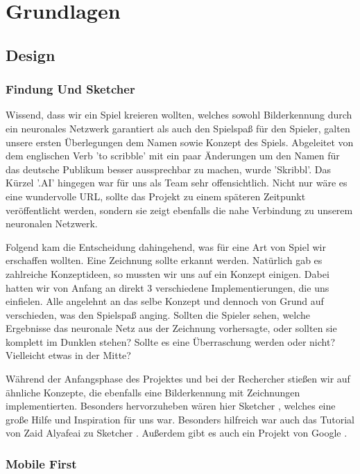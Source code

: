 \documentclass[11pt]{article}
\begin{document}
\section{Grundlagen}
\label{chap: Grundlagen}
\subsection{Design}
\subsubsection{Findung Und Sketcher}

Wissend, dass wir ein Spiel kreieren wollten, welches sowohl Bilderkennung durch ein neuronales Netzwerk garantiert als auch den Spielspaß für den Spieler, galten unsere ersten Überlegungen dem Namen sowie Konzept des Spiels.
Abgeleitet von dem englischen Verb 'to scribble' mit ein paar Änderungen um den Namen für das deutsche Publikum besser aussprechbar zu machen, wurde 'Skribbl'. Das Kürzel '.AI' hingegen war für uns als Team sehr offensichtlich. Nicht nur wäre es eine wundervolle URL, sollte das Projekt zu einem späteren Zeitpunkt veröffentlicht werden, sondern sie zeigt ebenfalls die nahe Verbindung zu unserem neuronalen Netzwerk.

Folgend kam die Entscheidung dahingehend, was für eine Art von Spiel wir erschaffen wollten. Eine Zeichnung sollte erkannt werden. Natürlich gab es zahlreiche Konzeptideen, so mussten wir uns auf ein Konzept einigen. Dabei hatten wir von Anfang an direkt 3 verschiedene Implementierungen, die uns einfielen. Alle angelehnt an das selbe Konzept und dennoch von Grund auf verschieden, was den Spielspaß anging. Sollten die Spieler sehen, welche Ergebnisse das neuronale Netz aus der Zeichnung vorhersagte, oder sollten sie komplett im Dunklen stehen? Sollte es eine Überraschung werden oder nicht? Vielleicht etwas in der Mitte?

Während der Anfangsphase des Projektes und bei der Rechercher stießen wir auf ähnliche Konzepte, die ebenfalls eine Bilderkennung mit Zeichnungen implementierten. Besonders hervorzuheben wären hier Sketcher \parencite{sketcher}, welches eine große Hilfe und Inspiration für uns war. Besonders hilfreich war auch das Tutorial von Zaid Alyafeai zu Sketcher \parencite{sketcherTutorial}. Außerdem gibt es auch ein Projekt von Google \parencite{quickDraw}.

\subsubsection{Mobile First}
\end{document}
